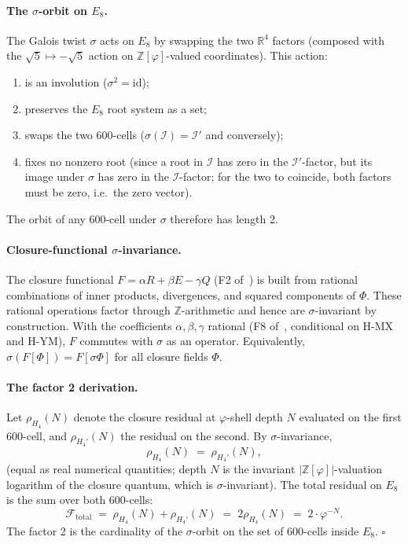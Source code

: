 \documentclass[11pt]{article}
\theoremstyle{plain}
\theoremstyle{definition}
\theoremstyle{remark}
\newcommand{\Zphi}{\mathbb{Z}[\varphi]}
\newcommand{\Fcal}{\mathcal{F}}
\newcommand{\Ical}{\mathcal{I}}
\begin{document}
\paragraph{The $\sigma$-orbit on $E_8$.}
The Galois twist $\sigma$ acts on $E_8$ by swapping the two $\mathbb{R}^4$ factors (composed with the $\sqrt 5 \mapsto -\sqrt 5$ action on $\Zphi$-valued coordinates). This action:
\begin{enumerate}[leftmargin=2em]
\item is an involution ($\sigma^2 = \mathrm{id}$);
\item preserves the $E_8$ root system as a set;
\item swaps the two 600-cells ($\sigma(\Ical) = \Ical'$ and conversely);
\item fixes no nonzero root (since a root in $\Ical$ has zero in the $\Ical'$-factor, but its image under $\sigma$ has zero in the $\Ical$-factor; for the two to coincide, both factors must be zero, i.e.\ the zero vector).
\end{enumerate}
The orbit of any 600-cell under $\sigma$ therefore has length 2.

\paragraph{Closure-functional $\sigma$-invariance.}
The closure functional $F = \alpha R + \beta E - \gamma Q$ (F2 of~\citealp{SmartXXXVI}) is built from rational combinations of inner products, divergences, and squared components of $\Phi$. These rational operations factor through $\mathbb{Z}$-arithmetic and hence are $\sigma$-invariant by construction. With the coefficients $\alpha, \beta, \gamma$ rational (F8 of~\citealp{SmartXXXVI}, conditional on H-MX and H-YM), $F$ commutes with $\sigma$ as an operator. Equivalently, $\sigma(F[\Phi]) = F[\sigma\Phi]$ for all closure fields $\Phi$.

\paragraph{The factor 2 derivation.}
Let $\rho_{H_4}(N)$ denote the closure residual at $\varphi$-shell depth $N$ evaluated on the first 600-cell, and $\rho_{H_4'}(N)$ the residual on the second. By $\sigma$-invariance,
\[
  \rho_{H_4}(N) \;=\; \rho_{H_4'}(N),
\]
(equal as real numerical quantities; depth $N$ is the invariant $|\Zphi|$-valuation logarithm of the closure quantum, which is $\sigma$-invariant). The total residual on $E_8$ is the sum over both 600-cells:
\[
  \Fcal_{\mathrm{total}} \;=\; \rho_{H_4}(N) + \rho_{H_4'}(N) \;=\; 2 \rho_{H_4}(N) \;=\; 2 \cdot \varphi^{-N}.
\]
The factor 2 is the cardinality of the $\sigma$-orbit on the set of 600-cells inside $E_8$. \hfill$\square$
\end{document}
